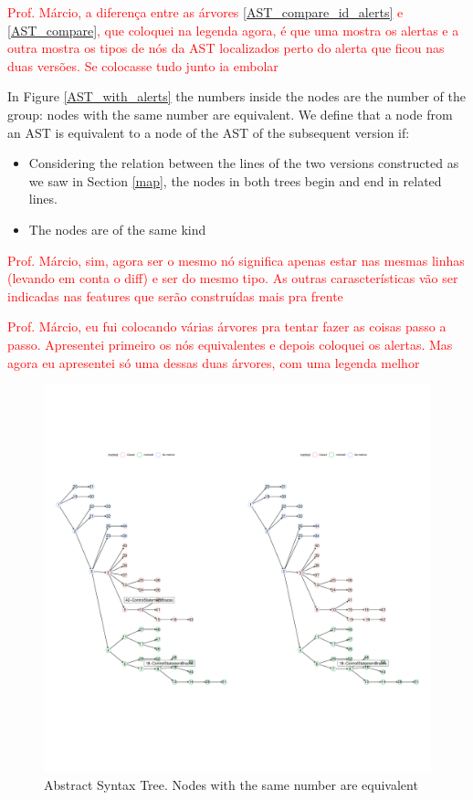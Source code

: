 \documentclass[
]{article}
\begin{document}
\normalsize

\textcolor{red}{Prof. Márcio, a diferença entre as árvores \ref{AST_compare_id_alerts} e \ref{AST_compare}, que coloquei na legenda agora, é que uma mostra os alertas e a outra mostra os tipos de nós da AST localizados perto do alerta que ficou nas duas versões. Se colocasse tudo junto ia embolar }

In Figure \ref{AST_with_alerts} the numbers inside the nodes are the
number of the group: nodes with the same number are equivalent. We
define that a node from an AST is equivalent to a node of the AST of the
subsequent version if:

\begin{itemize}
\item
  Considering the relation between the lines of the two versions
  constructed as we saw in Section \ref{map}, the nodes in both trees
  begin and end in related lines.
\item
  The nodes are of the same kind
\end{itemize}

\textcolor{red}{Prof. Márcio, sim, agora ser o mesmo nó significa apenas estar nas mesmas linhas (levando em conta o diff) e ser do mesmo tipo. As outras carascterísticas vão ser indicadas nas features que serão construídas mais pra frente}

\textcolor{red}{Prof. Márcio, eu fui colocando várias árvores pra tentar fazer as coisas passo a passo. Apresentei primeiro os nós equivalentes e depois coloquei os alertas. Mas agora eu apresentei só uma dessas duas árvores, com uma legenda melhor }

\small

\begin{figure}[H]
\includegraphics[width=1\linewidth]{match_algorithm_description_files/figure-latex/unnamed-chunk-6-1} \caption{Abstract Syntax Tree. Nodes with the same number are equivalent \label{AST_with_alerts}}\label{fig:unnamed-chunk-6}
\end{figure}
\end{document}
